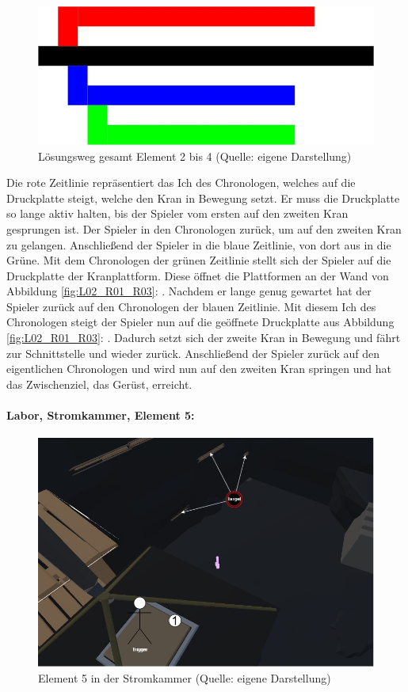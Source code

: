 \begin{figure}[ht]
\centering
\includegraphics[width=0.8\linewidth]{content/pictures/Raetsel-L02_E02_4_V01_Loesung}
\caption{Lösungsweg gesamt Element 2 bis 4 (Quelle: eigene Darstellung)}
\label{fig:L02_E02_04_L01}
\end{figure}

Die rote Zeitlinie repräsentiert das Ich des Chronologen, welches auf die Druckplatte steigt, welche den Kran in Bewegung setzt. Er muss die Druckplatte so lange aktiv halten, bis der Spieler vom ersten auf den zweiten Kran gesprungen ist. Der Spieler  in den Chronologen zurück, um auf den zweiten Kran zu gelangen. Anschließend  der Spieler in die blaue Zeitlinie, von dort aus in die Grüne. Mit dem Chronologen der grünen Zeitlinie stellt sich der Spieler auf die Druckplatte der Kranplattform. Diese öffnet die Plattformen an der Wand von Abbildung \ref{fig:L02_R01_R03}: . Nachdem er lange genug gewartet hat  der Spieler zurück auf den Chronologen der blauen Zeitlinie. Mit diesem Ich des Chronologen steigt der Spieler nun auf die geöffnete Druckplatte aus Abbildung \ref{fig:L02_R01_R03}: . Dadurch setzt sich der zweite Kran in Bewegung und fährt zur Schnittstelle und wieder zurück. Anschließend  der Spieler zurück auf den eigentlichen Chronologen und wird nun auf den zweiten Kran springen und hat das Zwischenziel, das Gerüst, erreicht.

\paragraph{Labor, Stromkammer, Element 5:}\label{p:lse5}

\begin{figure}[ht]
\centering
\includegraphics[width=0.8\linewidth]{content/pictures/Raetsel-L02_R01_R05.jpg}
\caption{Element 5 in der Stromkammer (Quelle: eigene Darstellung)}
\label{fig:L02_R01_R05}
\end{figure}

